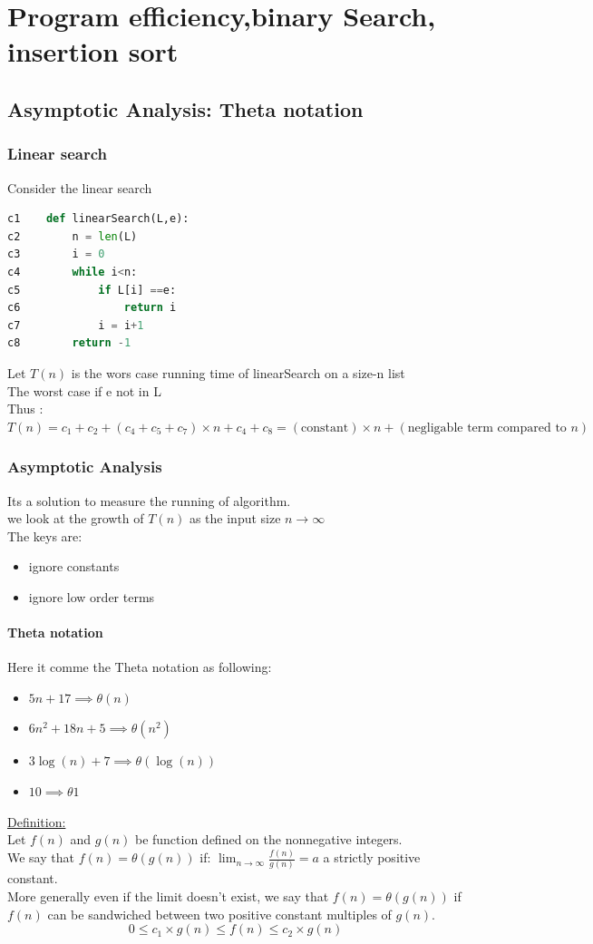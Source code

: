 \documentclass[12pt,oneside]{book}
\begin{document}
\chapter{Program efficiency,binary Search, insertion sort}
\section{Asymptotic Analysis: Theta notation}
\subsection{Linear search}
Consider the linear search
	{\small\begin{lstlisting}[language=python]
c1    def linearSearch(L,e):  
c2        n = len(L)
c3        i = 0 
c4        while i<n:
c5            if L[i] ==e:
c6                return i 
c7            i = i+1 
c8        return -1
\end{lstlisting}}
Let $T(n)$ is the wors case running time of linearSearch on a size-n list \\
The worst case if e not in L \\
Thus :\\
$T(n) = c_1 + c_2 + (c_4+c_5+c_7)\times n + c_4 + c_8= (\text{constant})\times n + (\text{negligable term compared to }n)$
\subsection{Asymptotic Analysis}
Its a solution to measure the running of algorithm.\\
we look at the growth of $T(n)$ as the input size $n\to\infty$\\
The keys are:
\begin{itemize}
	\item ignore constants
	\item ignore low order terms
\end{itemize}
\subsubsection{Theta notation}
Here it comme the Theta notation as following:
\begin{itemize}
	\item $5n+17 \implies \theta(n)$
	\item $6n^2+18n+5 \implies \theta(n^2)$
	\item $3\log(n) + 7\implies \theta(\log(n))$
	\item $10 \implies \theta{1}$
\end{itemize}
\underline{Definition:}\\
Let $f(n)$ and $g(n)$ be function defined on the nonnegative integers.\\
We say that $f(n) = \theta(g(n))$ if: $\boxed{\lim_{n\to\infty}\frac{f(n)}{g(n)} = a}$ a strictly positive constant.\\
More generally even if the limit doesn't exist, we say that $f(n) = \theta(g(n))$ if $f(n)$ can be sandwiched between two positive constant multiples of $g(n)$.\\
\[\boxed{ 0 \leq c_1 \times  g(n) \leq f(n) \leq c_2 \times g(n)}\]
\end{document}

